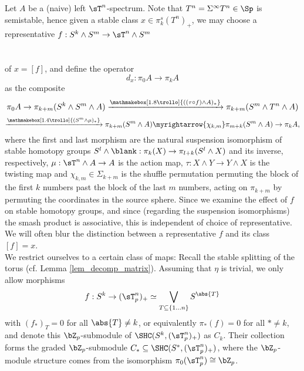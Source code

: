       \begin{defn}\label{def_diffs} %
        Let $A$ be a (naive) left $\sT^n$-spectrum. Note that $T^n =
        \Sigma^\infty T^n \in \Sp$ is semistable, hence given a stable class $x
        \in \pi^s_k(T^n)_+$, we may choose a representative $f: S^k \wedge S^m
        \to \sT^n \wedge S^m $\\
        \\
        \\
        of $x = [f]$, and define the operator
        \[	d_x: \pi_0 A \to \pi_k A	\]
        as the composite
        \[	\pi_0 A \to%
        \pi_{k+m} ( S^k \wedge S^m \wedge A ) %
          \xrightarrow{\mathmakebox[1.8\trollo]{( (\tau \circ f) \wedge A)_*}} %
        \pi_{k+m} ( S^m \wedge T^n \wedge A )
        \]
        \[
          \xrightarrow{\mathmakebox[1.4\trollo]%
            {(S^m \wedge \mu)_*}} %
        \pi_{k+m} ( S^m \wedge A ) %
          \myrightarrow{\chi_{k,m}} %
        \pi_{m+k} (S^m \wedge A ) %
          \to
        \pi_k A,	\]
      where the first and last morphism are the natural suspension isomorphism of stable homotopy groups $ S^l \wedge \blank: \pi_k(X) \to \pi_{l+k} (S^l \wedge X)$ and its inverse, respectively, $\mu: \sT^n \wedge A \to A$ is the action map, $\tau: X \wedge Y \to Y \wedge X$ is the twisting map and $\chi_{k,m} \in \Sigma_{k+m}$ is the shuffle permutation permuting the block of the first $k$ numbers past the block of the last $m$ numbers, acting on $\pi_{k+m}$ by permuting the coordinates in the source sphere. Since we examine the effect of $f$ on stable homotopy groups, and since (regarding the suspension isomorphisms) the smash product is associative, this is independent of choice of representative. We will often blur the distinction between a representative $f$ and its class $[f]=x$.\\
        We restrict ourselves to a certain class of maps: Recall the stable splitting of the torus (cf. Lemma \ref{lem_decomp_matrix}). Assuming that $\eta$ is trivial, we only allow morphisms%
        \[f: S^k \to (\sT_p^n)_+ \simeq \bigvee_{T \subseteq \{1 \ldots n \} } S^{\abs{T}}\] with $(f_*)_T = 0$ for all $\abs{T} \neq k$, or equivalently $\pi_*(f)=0$ for all $* \neq k$, and denote this $\bZ_p$-submodule of $\SHC(S^k,(\sT^n_p)_+)$ as $C_k$. Their collection forms the graded $\bZ_p$-submodule $C_* \subseteq \SHC(S^*,(\sT^n_p)_+)$, where the $\bZ_p$-module structure comes from the isomorphism $\pi_0(\sT_p^n) \cong \bZ_p$. %

\end{defn}
